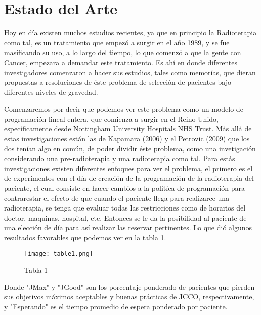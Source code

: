 \documentclass[letter, 10pt]{article}
\begin{document}
\newpage

\section{Estado del Arte}

Hoy en día existen muchos estudios recientes, ya que en principio la Radioterapia como tal, es un tratamiento que empezó a surgir en el año 1989, y se fue masificando su uso, a lo largo del tiempo, lo que comenzó a que la gente con Cancer, empezara a demandar este tratamiento. Es ahí en donde diferentes investigadores comenzaron a hacer sus estudios, tales como memorías, que dieran propuestas a resoluciones de éste problema de selección de pacientes bajo diferentes niveles de gravedad.

Comenzaremos por decir que podemos ver este problema como un modelo de programación lineal entera, que comienza a surgir en el Reino Unido, específicamente desde  Nottingham University Hospitals NHS Trust. Más allá de estas investigaciones están las de Kapamara (2006) y el Petrovic (2009) \cite{petrovic} que los dos tenían algo en común, de poder dividir éste problema, como una invetigación considerando una pre-radioterapia y una radioterapia como tal. Para estás investigaciones existen diferentes enfoques para ver el problema, el primero es el de experimentos con el día de creación de la programación de la radioterapia del paciente, el cual consiste en hacer cambios a la politíca de programación para contrarestar el efecto de que cuando el paciente llega para realizarce una radioterapia, se tenga que evaluar todas las restricciones como de horarios del doctor, maquinas, hospital, etc. Entonces se le da la posibilidad al paciente de una elección de día para así realizar las reservar pertinentes. Lo que dió algunos resultados favorables que podemos ver en la tabla 1.



\begin{figure}[h]
    \begin{center}
         \texttt{[image: table1.png]}\\
    \end{center}
    \caption{Tabla 1}
\end{figure}

\newpage

Donde "JMax" y "JGood" son los porcentaje ponderado de pacientes que pierden sus objetivos máximos aceptables y buenas prácticas de JCCO, respectivamente, y "Esperando" es el tiempo promedio de espera ponderado por paciente.
\end{document}
